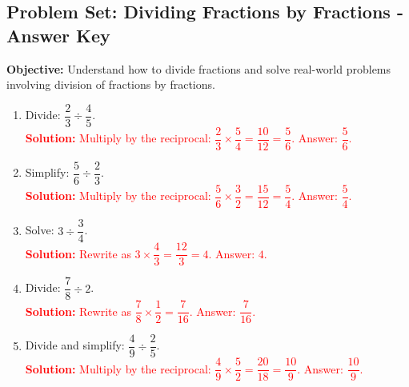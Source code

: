 \documentclass[12pt]{article}
\title{}
\date{}
\begin{document}
\subsection*{Problem Set: Dividing Fractions by Fractions - Answer Key}
\onehalfspacing

\begin{tcolorbox}[colframe=black!40, colback=gray!5, 
coltitle=black, colbacktitle=black!20, fonttitle=\bfseries\Large, 
title=Learning Objective, halign title=center, left=5pt, right=5pt, top=5pt, bottom=15pt]
\textbf{Objective:} Understand how to divide fractions and solve real-world problems involving division of fractions by fractions.
\end{tcolorbox}

\begin{tcolorbox}[colframe=black!60, colback=white, 
coltitle=black, colbacktitle=black!15, fonttitle=\bfseries\Large, 
title=Exercises, halign title=center, left=10pt, right=10pt, top=10pt, bottom=60pt]
\begin{enumerate}[itemsep=1em]
    \item Divide: \( \dfrac{2}{3} \div \dfrac{4}{5} \).\\
    \textcolor{red}{\textbf{Solution:} Multiply by the reciprocal: \( \dfrac{2}{3} \times \dfrac{5}{4} = \dfrac{10}{12} = \dfrac{5}{6} \). Answer: \( \dfrac{5}{6} \).}

    \item Simplify: \( \dfrac{5}{6} \div \dfrac{2}{3} \).\\
    \textcolor{red}{\textbf{Solution:} Multiply by the reciprocal: \( \dfrac{5}{6} \times \dfrac{3}{2} = \dfrac{15}{12} = \dfrac{5}{4} \). Answer: \( \dfrac{5}{4} \).}

    \item Solve: \( 3 \div \dfrac{3}{4} \).\\
    \textcolor{red}{\textbf{Solution:} Rewrite as \( 3 \times \dfrac{4}{3} = \dfrac{12}{3} = 4 \). Answer: \( 4 \).}

    \item Divide: \( \dfrac{7}{8} \div 2 \).\\
    \textcolor{red}{\textbf{Solution:} Rewrite as \( \dfrac{7}{8} \times \dfrac{1}{2} = \dfrac{7}{16} \). Answer: \( \dfrac{7}{16} \).}

    \item Divide and simplify: \( \dfrac{4}{9} \div \dfrac{2}{5} \).\\
    \textcolor{red}{\textbf{Solution:} Multiply by the reciprocal: \( \dfrac{4}{9} \times \dfrac{5}{2} = \dfrac{20}{18} = \dfrac{10}{9} \). Answer: \( \dfrac{10}{9} \).}


\end{enumerate}
\end{tcolorbox}
\end{document}

